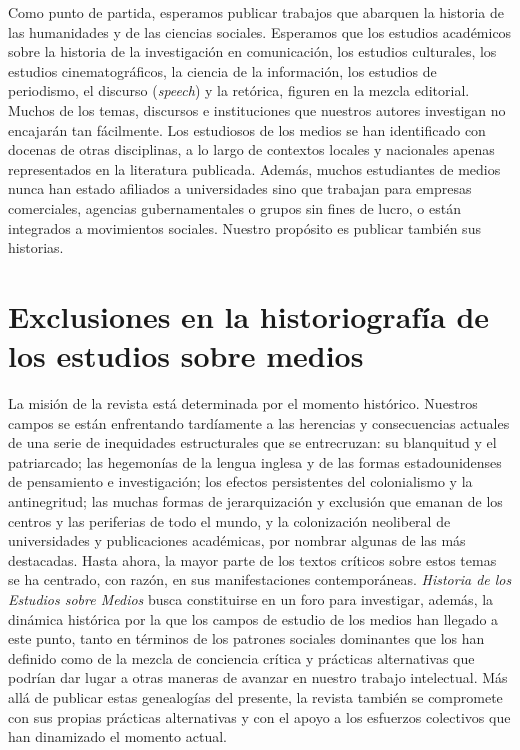 \documentclass{tufte-handout}
\begin{document}
Como punto de partida, esperamos publicar trabajos que abarquen la
historia de las humanidades y de las ciencias sociales. Esperamos que
los estudios académicos sobre la historia de la investigación en
comunicación, los estudios culturales, los estudios cinematográficos, la
ciencia de la información, los estudios de periodismo, el discurso
(\emph{speech}) y la retórica, figuren en la mezcla editorial. Muchos de
los temas, discursos e instituciones que nuestros autores investigan no
encajarán tan fácilmente. Los estudiosos de los medios se han
identificado con docenas de otras disciplinas, a lo largo de contextos
locales y nacionales apenas representados en la literatura publicada.
Además, muchos estudiantes de medios nunca han estado afiliados a
universidades sino que trabajan para empresas comerciales, agencias
gubernamentales o grupos sin fines de lucro, o están integrados a
movimientos sociales. Nuestro propósito es publicar también sus
historias.

\hypertarget{exclusiones-en-la-historiografuxeda-de-los-estudios-sobre-medios}{%
\section{Exclusiones en la historiografía de los estudios sobre
medios}\label{exclusiones-en-la-historiografuxeda-de-los-estudios-sobre-medios}}

La misión de la revista está determinada por el momento histórico.
Nuestros campos se están enfrentando tardíamente a las herencias y
consecuencias actuales de una serie de inequidades estructurales que se
entrecruzan: su blanquitud y el patriarcado; las hegemonías de la lengua
inglesa y de las formas estadounidenses de pensamiento e investigación;
los efectos persistentes del colonialismo y la antinegritud; las muchas
formas de jerarquización y exclusión que emanan de los centros y las
periferias de todo el mundo, y la colonización neoliberal de
universidades y publicaciones académicas, por nombrar algunas de las más
destacadas. Hasta ahora, la mayor parte de los textos críticos sobre
estos temas se ha centrado, con razón, en sus manifestaciones
contemporáneas. \emph{Historia de los Estudios sobre Medios} busca
constituirse en un foro para investigar, además, la dinámica histórica
por la que los campos de estudio de los medios han llegado a este punto,
tanto en términos de los patrones sociales dominantes que los han
definido como de la mezcla de conciencia crítica y prácticas
alternativas que podrían dar lugar a otras maneras de avanzar en nuestro
trabajo intelectual. Más allá de publicar estas genealogías del
presente, la revista también se compromete con sus propias prácticas
alternativas y con el apoyo a los esfuerzos colectivos que han
dinamizado el momento actual.
\end{document}
